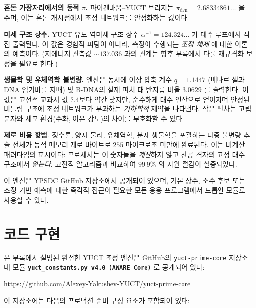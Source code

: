 \documentclass[12pt,a4paper]{article}
\begin{document}
	\textbf{혼돈 가장자리에서의 동적 $\pi$.} 파이겐바움–YUCT 브리지는 $\pi_{\mathrm{dyn}} = 2.68334861\ldots$ 을 주며, 이는 혼돈 개시점에서 조정 네트워크를 안정화하는 값이다.
	
	\textbf{미세 구조 상수.} YUCT 유도 역미세 구조 상수 $\alpha^{-1} = 124.324\ldots$ 가 대수 루프에서 직접 출력된다. 이 값은 경험적 피팅이 아니라, 측정이 수행되는 \emph{조정 체제} 에 대한 이론의 예측이다. (저에너지 관측값 $\sim 137.036$ 과의 관계는 향후 부록에서 다룰 재규격화 보정을 필요로 한다.)
	
	\textbf{생물학 및 유체역학 불변량.} 엔진은 동시에 이상 압축 계수 $q = 1.1447$ (베나르 셀과 DNA 염기비를 지배) 및 B-DNA의 실제 피치 대 반지름 비율 $3.0629$ 를 출력한다. 이 값은 고전적 교과서 값 3.4보다 약간 낮지만, 순수하게 대수 연산으로 얻어지며 안정된 비틀림 구조에 조정 네트워크가 부과하는 \emph{기하학적} 제약을 나타낸다. 작은 편차는 고립 분자와 세포 환경(수화, 이온 강도)의 차이를 부호화할 수 있다.
	
	\textbf{제로 비용 항법.} 정수론, 양자 물리, 유체역학, 분자 생물학을 포괄하는 다중 불변량 추출 전체가 동적 메모리 제로 바이트로 $255$ 마이크로초 미만에 완료된다. 이는 비계산 패러다임의 표시이다: 프로세서는 이 숫자들을 \emph{계산}하지 않고 진공 격자의 고정 대수 구조에서 \emph{읽는다}. 고전적 알고리즘과 비교하여 $99.9\%$ 의 자원 절감이 실증되었다.
	
	이 엔진은 YPSDC GitHub 저장소에서 공개되어 있으며, 기본 상수, 소수 후보 또는 조정 기반 예측에 대한 즉각적 접근이 필요한 모든 응용 프로그램에서 드롭인 모듈로 사용할 수 있다.
	
	\section{코드 구현}
	\label{sec:code}
	
	본 부록에서 설명된 완전한 \textsc{YUCT} 조정 엔진은 GitHub의 \texttt{yuct-prime-core} 저장소 내 모듈
	\textbf{\texttt{yuct\_constants.py v4.0 (AWARE Core)}} 로 공개되어 있다:
	\begin{center}
		\url{https://github.com/Alexey-Yakushev-YUCT/yuct-prime-core}
	\end{center}
	
	\noindent 이 저장소에는 다음의 프로덕션 준비 구성 요소가 포함되어 있다:
	
\end{document}
